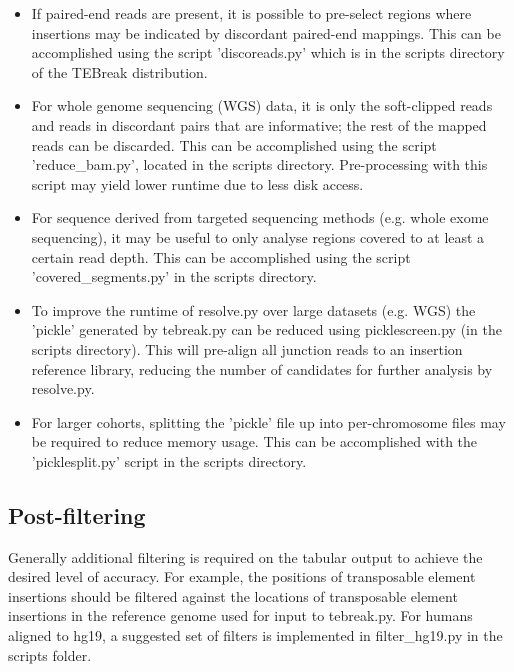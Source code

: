 \documentclass[letterpaper,11pt]{article}
\begin{document}
\begin{itemize}
\item If paired-end reads are present, it is possible to pre-select regions where insertions may be indicated by discordant paired-end mappings. This can be accomplished using the script 'discoreads.py' which is in the scripts directory of the TEBreak distribution. 
\item For whole genome sequencing (WGS) data, it is only the soft-clipped reads and reads in discordant pairs that are informative; the rest of the mapped reads can be discarded. This can be accomplished using the script 'reduce\_bam.py', located in the scripts directory. Pre-processing with this script may yield lower runtime due to less disk access.
\item For sequence derived from targeted sequencing methods (e.g. whole exome sequencing), it may be useful to only analyse regions covered to at least a certain read depth. This can be accomplished using the script 'covered\_segments.py' in the scripts directory.
\item To improve the runtime of resolve.py over large datasets (e.g. WGS) the 'pickle' generated by tebreak.py can be reduced using picklescreen.py (in the scripts directory). This will pre-align all junction reads to an insertion reference library, reducing the number of candidates for further analysis by resolve.py.
\item For larger cohorts, splitting the 'pickle' file up into per-chromosome files may be required to reduce memory usage. This can be accomplished with the 'picklesplit.py' script in the scripts directory.
\end{itemize}

\subsection{Post-filtering}
Generally additional filtering is required on the tabular output to achieve the desired level of accuracy. For example, the positions of transposable element insertions should be filtered against the locations of transposable element insertions in the reference genome used for input to tebreak.py. For humans aligned to hg19, a suggested set of filters is implemented in filter\_hg19.py in the scripts folder.
\end{document}
